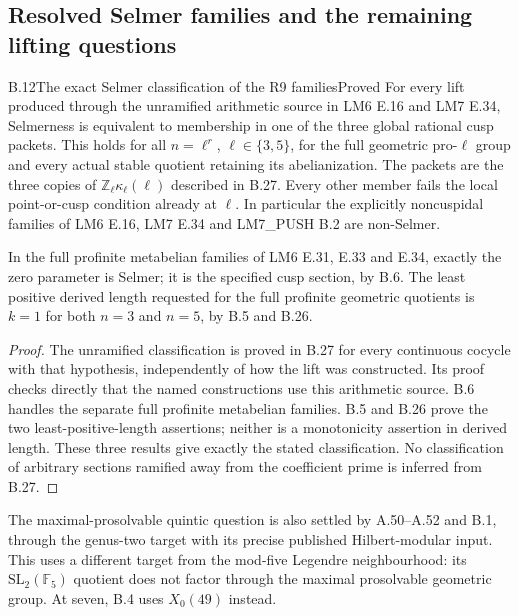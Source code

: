 \subsection{Resolved Selmer families and the remaining lifting questions}

\begin{statement}{B.12}{The exact Selmer classification of the R9 families}{Proved}
For every lift produced through the unramified arithmetic source
in LM6 E.16 and LM7 E.34, Selmerness is equivalent to membership
in one of the three global rational cusp packets. This holds for
all $n=\ell^r$, $\ell\in\{3,5\}$, for the full geometric
pro-$\ell$ group and every actual stable quotient retaining its
abelianization. The packets are the three copies of
$\mathbb Z_\ell\kappa_\ell(\ell)$ described in B.27.
Every other member fails the local point-or-cusp condition
already at $\ell$. In particular the explicitly noncuspidal
families of LM6 E.16, LM7 E.34 and LM7\_PUSH B.2 are non-Selmer.

In the full profinite metabelian families of LM6 E.31,
E.33 and E.34, exactly the zero parameter is Selmer; it is the
specified cusp section, by B.6. The least positive derived
length requested for the full profinite geometric quotients is
$k=1$ for both $n=3$ and $n=5$, by B.5 and B.26.
\end{statement}
\begin{proof}
The unramified classification is proved in B.27 for every
continuous cocycle with that hypothesis, independently of how
the lift was constructed. Its proof checks directly that the
named constructions use this arithmetic source. B.6 handles
the separate full profinite metabelian families. B.5 and B.26
prove the two least-positive-length assertions; neither is a
monotonicity assertion in derived length. These three results
give exactly the stated classification. No classification of
arbitrary sections ramified away from the coefficient prime
is inferred from B.27.
\end{proof}
The maximal-prosolvable quintic question is also settled by
A.50--A.52 and B.1, through the genus-two target with its
precise published Hilbert-modular input. This uses a different
target from the mod-five Legendre neighbourhood: its
$\mathrm{SL}_2(\mathbb F_5)$ quotient does not factor through
the maximal prosolvable geometric group. At seven, B.4 uses
$X_0(49)$ instead.

